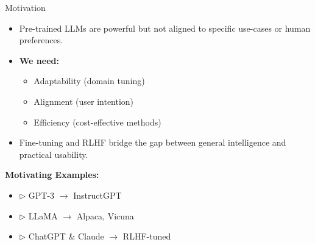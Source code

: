 \begin{frame}[t]{Motivation}
  \begin{itemize}
    \item<+-> Pre-trained LLMs are powerful but not aligned to specific use-cases or human preferences.
    \item<+-> \textbf{We need:}
      \begin{itemize}
        \item Adaptability (domain tuning)
        \item Alignment (user intention)
        \item Efficiency (cost-effective methods)
      \end{itemize}
    \item<+-> Fine-tuning and RLHF bridge the gap between general intelligence and practical usability.
  \end{itemize}
  \vspace{0.5em}
  \textbf{Motivating Examples:}
  \begin{itemize}
    \item[] $\triangleright$ GPT-3 $\rightarrow$ InstructGPT
    \item[] $\triangleright$ LLaMA $\rightarrow$ Alpaca, Vicuna
    \item[] $\triangleright$ ChatGPT \& Claude $\rightarrow$ RLHF-tuned
  \end{itemize}
\end{frame}
